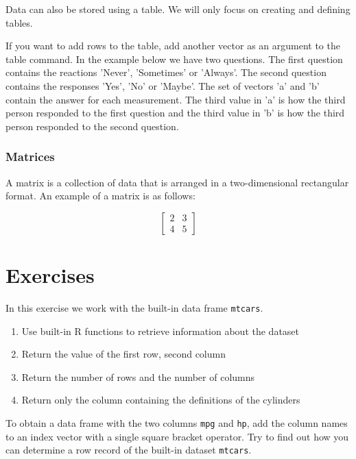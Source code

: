 Data can also be stored using a table. We will only focus on creating and defining tables.



If you want to add rows to the table, add another vector as an argument to the table command.
In the example below we have two questions.
The first question contains the reactions 'Never', 'Sometimes' or 'Always'.
The second question contains the responses 'Yes', 'No' or 'Maybe'.
The set of vectors 'a' and 'b' contain the answer for each measurement.
The third value in 'a' is how the third person responded to the first question and the third value in 'b' is how the third person responded to the second question.



\subsubsection{Matrices}

A matrix is a collection of data that is arranged in a two-dimensional rectangular format. An example of a matrix is as follows:

\[
\begin{bmatrix}
2 & 3 \\ 
4 & 5  
\end{bmatrix}
\]



\section{Exercises}

\begin{exercise}
    In this exercise we work with the built-in data frame \texttt{mtcars}. 
    \begin{enumerate}
        \item   Use built-in R functions to retrieve information about the dataset
        \item   Return the value of the first row, second column
        \item   Return the number of rows and the number of columns
        \item   Return only the column containing the definitions of the cylinders
    \end{enumerate}
    
    To obtain a data frame with the two columns \texttt{mpg} and \texttt{hp}, 
    add the column names to an index vector with a single square bracket operator.
    Try to find out how you can determine a row record of the built-in dataset \texttt{mtcars}.
\end{exercise}

